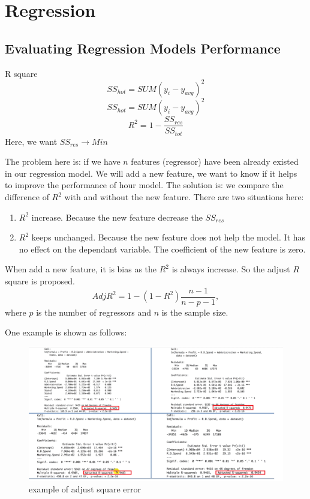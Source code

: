 \chapter{Regression}
\section{Evaluating Regression Models Performance}
R square
\begin{equation}
SS_{hot}=SUM(y_i-y_{avg})^2
\end{equation}
\begin{equation}
SS_{hot}=SUM(y_i-y_{avg})^2
\end{equation}
\begin{equation}
R^2=1-\frac{SS_{res}}{SS_{tot}}
\end{equation}
Here, we want $SS_{res} \rightarrow Min$

The problem here is: if we have $n$ features (regressor) have been already existed in our regression model. We will add a new feature, we want to know if it helps to improve the performance of hour model. The solution is: we compare the difference of $R^2$ with and without the new feature. There are two situations here:
\begin{enumerate}
	\item $R^2$ increase. Because the new feature decrease the $SS_{res}$
	\item $R^2$ keeps unchanged. Because the new feature does not help the model. It has no effect on the dependant variable. The coefficient of the new feature is zero.
\end{enumerate}
When add a new feature, it is bias as the $R^2$ is always increase. So the adjust $R$ square is proposed.
\begin{equation}
Adj R^2 = 1- (1 - R^2)\frac{n-1}{n-p-1},
\end{equation}
where $p$ is the number of regressors and $n$ is the sample size.

One example is shown as follows:
\begin{figure}
	\includegraphics[width=\linewidth]{./figures/adjust_r_square.png}
	\centering
	\caption{example of adjust square error}
\end{figure}

